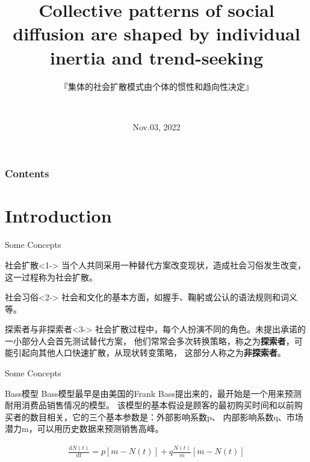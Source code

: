 \documentclass{beamer}
\title[|网络科学导论|] %
{Collective patterns of social diffusion are shaped by individual inertia and trend-seeking}
\subtitle{『集体的社会扩散模式由个体的惯性和趋向性决定』}
\author[授课老师：梁海丽] %
{~}
\institute[SHU] %
{
	\Large{
		\begin{block}{\centerline{Shanghai University}}
	\centerline{\large{Jie Xing}-\normalsize{20121192@ICS}\\}
	\centerline{\large{Shiwei Wang}-\normalsize{20121016@Automation}\\}
	\centerline{\large{Sicheng Zhang}-\normalsize{19123001@Industrial Engineering}\\}
        \end{block}}
}
\date[2022-11-03] %
{Nov.03, 2022}
\begin{document}
	
	\frame{\titlepage}
	
	

	\begin{frame}
		\frametitle{Contents}
		\tableofcontents
	\end{frame}


\section{Introduction}
\begin{frame}
	\sectionpage
\end{frame}
	\begin{frame}{Some Concepts}

		
\begin{block}{社会扩散}<1-> 
	当个人共同采用一种替代方案改变现状，造成社会习俗发生改变，这一过程称为社会扩散。
\end{block}

\begin{block}{社会习俗}<2-> 
	社会和文化的基本方面，如握手、鞠躬或公认的语法规则和词义等。
\end{block}

\begin{block}{探索者与非探索者}<3-> 
	社会扩散过程中，每个人扮演不同的角色。未提出承诺的一小部分人会首先测试替代方案，
	他们常常会多次转换策略，称之为\textbf{探索者}，可能引起向其他人口快速扩散，从现状转变策略，
	这部分人称之为\textbf{非探索者}。
\end{block}

	\end{frame}


\begin{frame}{Some Concepts}
		\begin{block}{Bass模型}
			Bass模型最早是由美国的Frank Bass提出来的，最开始是一个用来预测耐用消费品销售情况的模型。
			该模型的基本假设是顾客的最初购买时间和以前购买者的数目相关，它的三个基本参数是：外部影响系数p、
			内部影响系数q、市场潜力m，可以用历史数据来预测销售高峰。
		\end{block}
		\begin{block}{}
		\begin{equation*}
			\begin{aligned}
				\frac{\mathrm{d} N(t)}{\mathrm{d} t}=p[m-N(t)]+q\frac{N(t)}{m}[m-N(t)]
			\end{aligned}
		\end{equation*}
	    \end{block}
\end{frame}
\end{document}
